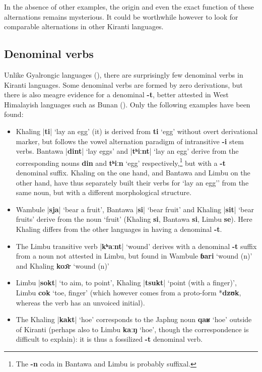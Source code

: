 \documentclass[oldfontcommands,oneside,a4paper,11pt]{article}
\newcommand{\ipa}[1]{\textbf{{\phon\mbox{#1}}}} %
\newcommand{\dhatu}[2]{|\ipa{#1}| `#2'}
\begin{document}

In the absence of other examples, the origin and even the exact function of these alternations remains mysterious. It could be worthwhile however to look for comparable alternations in other Kiranti languages.

\subsection{Denominal verbs} \label{sec:denom}
Unlike Gyalrongic languages (\citealt{jacques14antipassive}), there are surprisingly few denominal verbs in Kiranti languages. Some denominal verbs are formed by zero derivations, but there is also meagre evidence for a denominal \ipa{-t}, better attested in West Himalayish languages such as Bunan (\citealt[426]{widmer14bunan}). Only the following examples have been found:
\begin{itemize}
\item Khaling \dhatu{ti}{lay an egg} (it) is derived from \ipa{ti} `egg' without overt derivational marker, but follows the vowel alternation paradigm of intransitive \ipa{-i} stem verbs. Bantawa \dhatu{dint}{lay eggs} and \dhatu{tʰiːnt}{lay an egg} derive from the corresponding nouns  \ipa{din} and \ipa{tʰiːn} `egg' respectively,\footnote{The \ipa{-n} coda in Bantawa and Limbu is probably suffixal.} but with a \ipa{-t} denominal suffix. Khaling on the one hand, and Bantawa and Limbu on the other hand, have thus separately built their verbs for `lay an egg'' from the same noun, but with a different morphological structure.
\item Wambule \dhatu{sja}{bear a fruit}, Bantawa  \dhatu{si}{bear fruit} and Khaling \dhatu{sit}{bear fruits} derive from the noun `fruit' (Khaling \ipa{si},  Bantawa \ipa{si}, Limbu \ipa{se}). Here Khaling differs from the other languages in having a denominal \ipa{-t}.
 \item The Limbu transitive verb \dhatu{kʰaːnt}{wound} derives with a denominal \ipa{-t} suffix from a noun not attested in Limbu, but found in Wambule \ipa{ɓari} `wound (n)' and Khaling \ipa{koɔ̄r} `wound (n)'
 \item Limbu \dhatu{sokt}{to aim, to point}, Khaling \dhatu{tsukt}{point (with a finger)}, Limbu \ipa{cok} `toe, finger' (which however comes from a proto-form *\ipa{dzʊk}, whereas the verb has an unvoiced initial).
 \item The Khaling \dhatu{kakt}{hoe} corresponds to the Japhug noun \ipa{qaʁ} `hoe' outside of Kiranti (perhaps also to Limbu \ipa{kaːŋ} `hoe', though the correspondence is difficult to explain): it is thus a fossilized \ipa{-t} denominal verb.
\end{itemize}  
\end{document}
